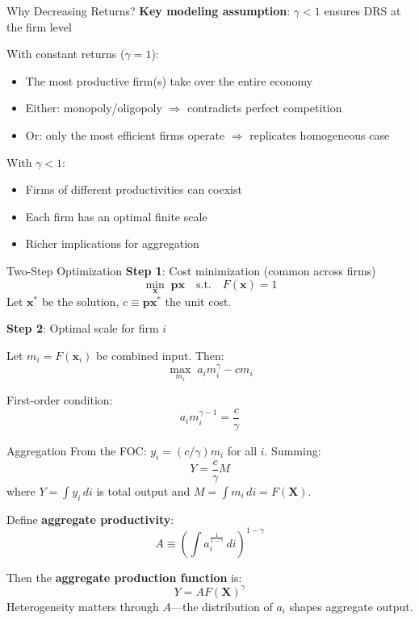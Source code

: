 \documentclass[blue]{beamer}
\begin{document}
\begin{frame}{Why Decreasing Returns?}
	\textbf{Key modeling assumption}: $\gamma < 1$ ensures DRS at the firm level
	\medskip
	
	With constant returns ($\gamma = 1$):
	\begin{itemize}
		\item The most productive firm(s) take over the entire economy
		\item Either: monopoly/oligopoly $\Rightarrow$ contradicts perfect competition
		\item Or: only the most efficient firms operate $\Rightarrow$ replicates homogeneous case
	\end{itemize}
	\medskip
	With $\gamma < 1$:
	\begin{itemize}
		\item Firms of different productivities can coexist
		\item Each firm has an optimal finite scale
		\item Richer implications for aggregation
	\end{itemize}
\end{frame}

\begin{frame}{Two-Step Optimization}
	\textbf{Step 1}: Cost minimization (common across firms)
	\[
	\min_{\mathbf{x}} \; \mathbf{px} \quad \text{s.t.} \quad F(\mathbf{x}) = 1
	\]
	Let $\mathbf{x}^*$ be the solution, $c \equiv \mathbf{px}^*$ the unit cost.
	
	\bigskip
	\textbf{Step 2}: Optimal scale for firm $i$
	
	Let $m_i = F(\mathbf{x}_i)$ be combined input. Then:
	\[
	\max_{m_i} \; a_i m_i^\gamma - c m_i
	\]
	
	First-order condition:
	\[
	a_i m_i^{\gamma - 1} = \frac{c}{\gamma}
	\]
\end{frame}

\begin{frame}{Aggregation}
	From the FOC: $y_i = (c/\gamma) m_i$ for all $i$. Summing:
	\[
	Y = \frac{c}{\gamma} M
	\]
	where $Y = \int y_i \, di$ is total output and $M = \int m_i \, di = F(\mathbf{X})$.
	
	\bigskip
	Define \textbf{aggregate productivity}:
	\[
	A \equiv \left( \int a_i^{\frac{1}{1-\gamma}} \, di \right)^{1-\gamma}
	\]
	
	Then the \textbf{aggregate production function} is:
	\[
	Y = A F(\mathbf{X})^\gamma
	\]
	Heterogeneity matters through $A$---the distribution of $a_i$ shapes aggregate output.
\end{frame}
\end{document}
